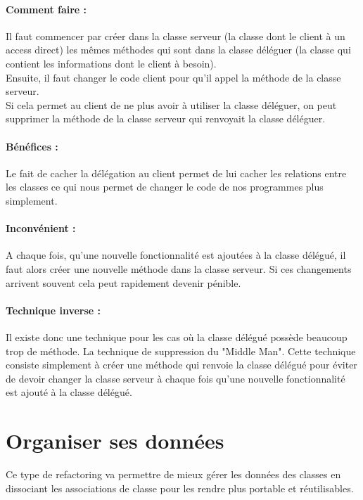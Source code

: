 \documentclass[a4paper,twoside,12pt,openright]{report}
\begin{document}
\paragraph{Comment faire :}
Il faut commencer par créer dans la classe serveur (la classe dont le client à un access direct) les mêmes méthodes qui sont dans la classe déléguer (la classe qui contient les informations dont le client à besoin).\\
Ensuite, il faut changer le code client pour qu'il appel la méthode de la classe serveur.\\
Si cela permet au client de ne plus avoir à utiliser la classe déléguer, on peut supprimer la méthode de la classe serveur qui renvoyait la classe déléguer.

\paragraph{Bénéfices :}
Le fait de cacher la délégation au client permet de lui cacher les relations entre les classes ce qui nous permet de changer le code de nos programmes plus simplement.

\paragraph{Inconvénient :}
A chaque fois, qu'une nouvelle fonctionnalité est ajoutées à la classe délégué, il faut alors créer une nouvelle méthode dans la classe serveur. Si ces changements arrivent souvent cela peut rapidement devenir pénible.

\paragraph{Technique inverse :}
Il existe donc une technique pour les cas où la classe délégué possède beaucoup trop de méthode.
La technique de suppression du "Middle Man".
Cette technique consiste simplement à créer une méthode qui renvoie la classe délégué pour éviter de devoir changer la classe serveur à chaque fois qu'une nouvelle fonctionnalité est ajouté à la classe délégué.


\newpage
\section{Organiser ses données}
Ce type de refactoring va permettre de mieux gérer les données des classes en dissociant les associations de classe pour les rendre plus portable et réutilisables.
\end{document}
